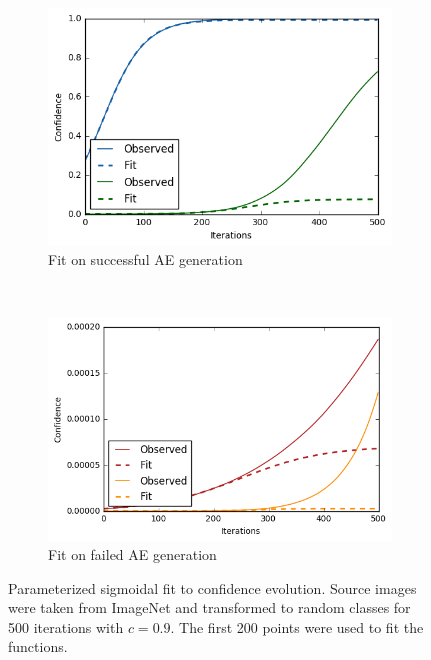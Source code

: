 \documentclass[11pt, a4paper]{article}
\begin{document}
\begin{figure}[h!tb]
    \centering
    \begin{subfigure}[b]{0.45\textwidth}
    		\centering
        \includegraphics[scale=0.5]{progress/imagenet-ae-50-500-0dot9-thresholds-0dot5-0dot1-success.png}
        \caption{Fit on successful AE generation}
        \label{fig:progress-fit-success}
    \end{subfigure}
    ~ %
    \begin{subfigure}[b]{0.45\textwidth}
    		\centering
        \includegraphics[scale=0.5]{progress/imagenet-ae-50-500-0dot9-thresholds-0dot5-0dot1-failure.png}
        \caption{Fit on failed AE generation}
        \label{fig:progress-fit-failure}
    \end{subfigure}
    \caption{Parameterized sigmoidal fit to confidence evolution. Source images were taken from ImageNet and transformed to random classes for 500 iterations with $c = 0.9$. The first 200 points were used to fit the functions.}
    \label{fig:progress-fit}
\end{figure}
\end{document}
